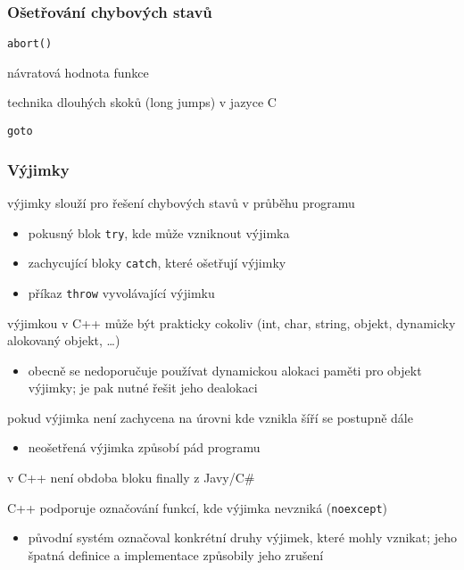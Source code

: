 

\begin{frame}[fragile]
\frametitle{Ošetřování chybových stavů}

\begin{bitemize}
\item \lstinline|abort()|
\item návratová hodnota funkce
\item technika dlouhých skoků (long jumps) v jazyce C
\item \lstinline|goto|
\end{bitemize}
\end{frame}


\begin{frame}[fragile]
\frametitle{Výjimky}

\begin{bitemize}
\item výjimky slouží pro řešení chybových stavů v průběhu programu
\begin{itemize}
\item pokusný blok \lstinline|try|, kde může vzniknout výjimka
\item zachycující bloky \lstinline|catch|, které ošetřují výjimky
\item příkaz \lstinline|throw| vyvolávající výjimku
\end{itemize}
\item výjimkou v C++ může být prakticky cokoliv (int, char, string, objekt, dynamicky alokovaný objekt, \ldots)
\begin{itemize}
\item obecně se nedoporučuje používat dynamickou alokaci paměti pro objekt výjimky; je pak nutné řešit jeho dealokaci
\end{itemize}
\item pokud výjimka není zachycena na úrovni kde vznikla šíří se postupně dále
\begin{itemize}
\item neošetřená výjimka způsobí pád programu
\end{itemize}
\item v C++ není obdoba bloku {\ttfamily finally} z Javy/C\#
\item C++ podporuje označování funkcí, kde výjimka nevzniká (\lstinline|noexcept|)
\begin{itemize}
\item původní systém označoval konkrétní druhy výjimek, které mohly vznikat; jeho špatná definice a implementace způsobily jeho zrušení
\end{itemize}
\end{bitemize}
\end{frame}


